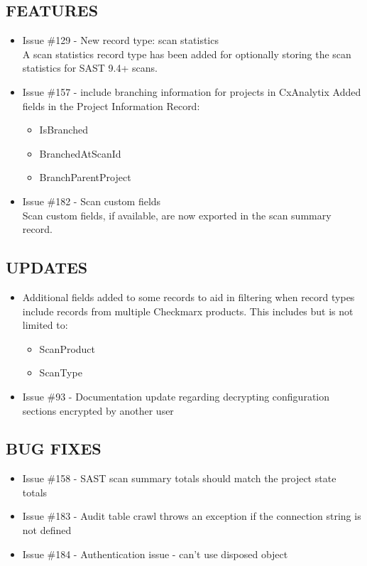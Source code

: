 \subsection*{FEATURES}
    \begin{itemize}
        \item Issue \#129 - New record type: scan statistics\\
		\indent A scan statistics record type has been added for optionally storing the scan statistics for SAST 9.4+ scans.
	
        \item Issue \#157 - include branching information for projects in CxAnalytix
		\indent Added fields in the Project Information Record:
        \begin{itemize}
			\item IsBranched
			\item BranchedAtScanId
			\item BranchParentProject
        \end{itemize}
			
	    \item Issue \#182 - Scan custom fields\\
		\indent Scan custom fields, if available, are now exported in the scan summary record.    
    \end{itemize}

\subsection*{UPDATES}
    \begin{itemize}
        \item Additional fields added to some records to aid in filtering when record types include records from multiple Checkmarx products.  
        This includes but is not limited to:
        \begin{itemize}
            \item ScanProduct
            \item ScanType
        \end{itemize}
        \item Issue \#93 - Documentation update regarding decrypting configuration sections encrypted by another user
    \end{itemize}

\subsection*{BUG FIXES}
    \begin{itemize}
        \item Issue \#158 - SAST scan summary totals should match the project state totals
        \item Issue \#183 - Audit table crawl throws an exception if the connection string is not defined
        \item Issue \#184 - Authentication issue - can't use disposed object
    \end{itemize}



